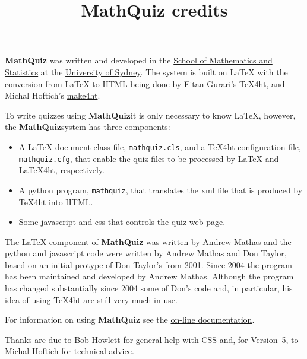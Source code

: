 \documentclass{mathquiz}
\title{MathQuiz credits}
\newcommand{\MathQuiz}{\textbf{MathQuiz}}
\begin{document}
\begin{discussion}[Credits]
    \MathQuiz{} was written and developed in the
    \href{http://www.maths.usyd.edu.au/}{School of Mathematics and
    Statistics} at the \href{http://www.usyd.edu.au/}{University of
    Sydney}.  The system is built on \LaTeX{} with the conversion from
    \LaTeX{} to HTML being done by Eitan Gurari's
    \href{http://www.cis.ohio-state.edu/~gurari/TeX4ht/mn.html}{TeX4ht},
    and Michal Hoftich's
    \href{https://github.com/michal-h21/make4ht}{make4ht}.

    To write quizzes using \MathQuiz it is only necessary to know
    \LaTeX, however, the \MathQuiz system has three components:
    \begin{itemize}
      \item A \LaTeX{} document class file, \texttt{mathquiz.cls}, and
      a \TeX 4ht configuration file, \texttt{mathquiz.cfg}, that enable the
      quiz files to be processed by \LaTeX{} and \LaTeX 4ht,
      respectively.
      \item A python program, \texttt{mathquiz}, that translates the xml
      file that is produced by \TeX 4ht into  HTML.
      \item Some javascript and css that controls the quiz web page.
    \end{itemize}

   The \LaTeX{} component of \MathQuiz{} was written by Andrew Mathas
   and the python and javascript code were written by Andrew Mathas and
   Don Taylor, based on an initial protype of Don Taylor's from 2001.
   Since 2004 the program has been maintained and developed by Andrew
   Mathas. Although the program has changed substantially since 2004
   some of Don's code and, in particular, his idea of using \TeX 4ht are
   still very much in use.

   For information on using \MathQuiz{} see the
   \href{http://www.maths.usyd.edu.au/u/MOW/MathQuiz/doc/mathquiz-manual.html}{on-line documentation}.

   Thanks are due to Bob Howlett for general help with CSS and, for
   Version~5, to  Michal Hoftich for technical advice.
\end{discussion}
\end{document}
